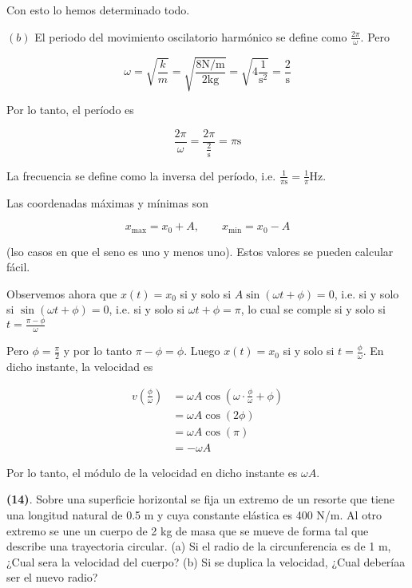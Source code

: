 \documentclass[12pt]{article}
\theoremstyle{definition}
\begin{document}
Con esto lo hemos determinado todo. 

$(b)$ El periodo del movimiento oscilatorio harmónico se define como
$\frac{2\pi}{\omega}$. Pero 

\begin{equation*}
    \omega = \sqrt{\frac{k}{m}} = \sqrt{\frac{8\text{N/m}}{2\text{kg}}}  =
    \sqrt{4 \frac{1}{\text{s}^2}} = \frac{2}{\text{s}}
\end{equation*}

Por lo tanto, el período es 

\begin{equation*}
    \frac{2\pi}{\omega} = \frac{2\pi}{\frac{2}{\text{s}}} = \pi\text{s}
\end{equation*}

La frecuencia se define como la inversa del período, i.e.
$\frac{1}{\pi\text{s}} = \frac{1}{\pi}\text{Hz}$.

Las coordenadas máximas y mínimas son 

\begin{equation*}
    x_{\text{max}} = x_0 + A, \qquad x_{\text{min}} = x_0 - A
\end{equation*}

(lso casos en que el seno es uno y menos uno). Estos valores se pueden calcular
fácil. 

Observemos ahora que $x(t) = x_0$ si y solo si $A \sin(\omega t + \phi) = 0$,
i.e. si y solo si $\sin(\omega t + \phi) = 0$, i.e. si 
y solo si $\omega t + \phi = \pi$, lo cual se comple si y solo si 
$t = \frac{ \pi - \phi }{\omega}$

Pero $\phi = \frac{\pi}{2}$ y por lo tanto $\pi - \phi = \phi$. Luego $x(t) =
x_0$ si y solo si $t = \frac{\phi}{\omega}$. En dicho instante, la velocidad es 

\begin{align*}
    v\left(\frac{\phi}{\omega}\right) 
    &= \omega A \cos\left(\omega \cdot \frac{\phi}{\omega} +
    \phi\right)\\ 
    &= \omega A \cos(2\phi)  \\ 
    &=\omega A \cos(\pi) \\ 
    &=-\omega A
\end{align*}

Por lo tanto, el módulo de la velocidad en dicho instante es $\omega A$.

\pagebreak 

\begin{shaded}
    \textbf{(14)}. Sobre una superficie horizontal se fija un extremo de un resorte que tiene una longitud
natural de 0.5 m y cuya constante elástica es 400 N/m. Al otro extremo se une un
cuerpo de 2 kg de masa que se mueve de forma tal que describe una trayectoria
circular.
(a) Si el radio de la circunferencia es de 1 m, ¿Cual sera la velocidad del cuerpo?
(b) Si se duplica la velocidad, ¿Cual deberíaa ser el nuevo radio?
\end{shaded}
\end{document}
